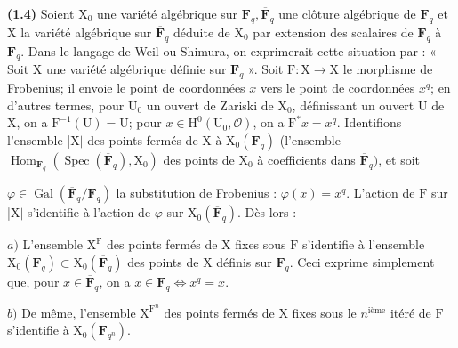 \documentclass[10pt,leqno]{article}
\begin{document}
\noindent \textbf{(1.4)} Soient \(\mathrm{X}_{0}\) une variété algébrique sur \(\mathbf{F}_{q}, \overline{\mathbf{F}}_{q}\) une clôture algébrique de \(\mathbf{F}_{q}\) et \(\mathrm{X}\) la variété algébrique sur \(\overline{\mathbf{F}}_{q}\) déduite de \(\mathrm{X}_{0}\) par extension des scalaires de \(\mathbf{F}_{q}\) à \(\overline{\mathbf{F}}_{q}\). Dans le langage de Weil ou Shimura, on exprimerait cette situation par : « Soit \(\mathrm{X}\) une variété algébrique définie sur \(\mathbf{F}_{q}\) ». Soit \(\mathrm{F} : \mathrm{X}\longrightarrow \mathrm{X}\) le morphisme de Frobenius; il envoie le point de coordonnées \(x\) vers le point de coordonnées \(x^{q}\); en d’autres termes, pour \(\mathrm{U}_{0}\) un ouvert de Zariski de \(\mathrm{X}_{0}\), définissant un ouvert \(\mathrm{U}\) de \(\mathrm{X}\), on a \(\mathrm{F}^{- 1}(\mathrm{U})=\mathrm{U}\); pour \(x\in \mathrm{H}^{0}(\mathrm{U}_{0}, \mathcal{O})\), on a \(\mathrm{F}^{*}x=x^{q}\). Identifions l’ensemble |\(\mathrm{X}|\) des points fermés de \(\mathrm{X}\) à \(\mathrm{X}_{0}(\overline{\mathbf{F}}_{q})\) (l’ensemble \(\operatorname{Hom}_{\mathbf{F}_{q}}(\operatorname{Spec}(\overline{\mathbf{F}}_{q}), \mathrm{X}_{0})\) des points de \(\mathrm{X}_{0}\) à coefficients dans \(\overline{\mathbf{F}}_{q})\), et soit\par

\clearpage

\label{physical-4}

\noindent \(\varphi \in \operatorname{Gal}(\overline{\mathbf{F}}_{q}/\mathbf{F}_{q})\) la substitution de Frobenius : \(\varphi (x)=x^{q}\). L’action de \(\mathrm{F}\) sur |\(\mathrm{X}|\) s’identifie à l’action de \(\varphi \) sur \(\mathrm{X}_{0}(\overline{\mathbf{F}}_{q})\). Dès lors :\par

\noindent \(a)\) L’ensemble \(\mathrm{X}^{\mathrm{F}}\) des points fermés de \(\mathrm{X}\) fixes sous \(\mathrm{F}\) s’identifie à l’ensemble \(\mathrm{X}_{0}(\mathbf{F}_{q})\subset \mathrm{X}_{0}(\overline{\mathbf{F}}_{q})\) des points de \(\mathrm{X}\) définis sur \(\mathbf{F}_{q}\). Ceci exprime simplement que, pour \(x\in \overline{\mathbf{F}}_{q}\), on a \(x\in \mathbf{F}_{q} \Leftrightarrow  x^{q}=x\).\par

\noindent \(b)\) De même, l’ensemble \(\mathrm{X}^{\mathrm{F}^{n}}\) des points fermés de \(\mathrm{X}\) fixes sous le \(n^{\mathrm{ième}}\) itéré de \(\mathrm{F}\) s’identifie à \(\mathrm{X}_{0}(\mathbf{F}_{q^{n}})\).\par
\end{document}
